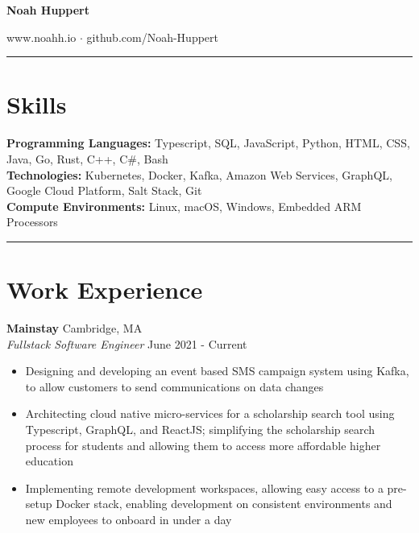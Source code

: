 \documentclass[10pt]{article}
\begin{document}

\centering
	{\huge\textbf{Noah Huppert}}
	\vspace{1ex}

	
	www.noahh.io $\cdot$ github.com/Noah-Huppert

	\rule{\columnwidth}{1pt}

\begin{flushleft}

\section{Skills}
    \textbf{Programming Languages:} Typescript, SQL, JavaScript, Python, HTML, CSS, Java, Go, Rust, C++, C\#, Bash \\ %
	\textbf{Technologies:} Kubernetes, Docker, Kafka, Amazon Web Services, GraphQL, Google Cloud Platform, Salt Stack, Git \\
	\textbf{Compute Environments:} Linux, macOS, Windows, Embedded ARM Processors

	\rule{\columnwidth}{0.4pt}

\section{Work Experience}
	\textbf{Mainstay} \hfill Cambridge, MA \\
	\textit{Fullstack Software Engineer} \hfill June 2021 - Current \\
    \begin{itemize}
		\item Designing and developing an event based SMS campaign system using Kafka, to allow customers to send communications on data changes

        \item Architecting cloud native micro-services for a scholarship search tool using Typescript, GraphQL, and ReactJS; simplifying the scholarship search process for students and allowing them to access more affordable higher education

        \item Implementing remote development workspaces, allowing easy access to a pre-setup Docker stack, enabling development on consistent environments and new employees to onboard in under a day 
	\end{itemize}


\end{flushleft}
\end{document}
